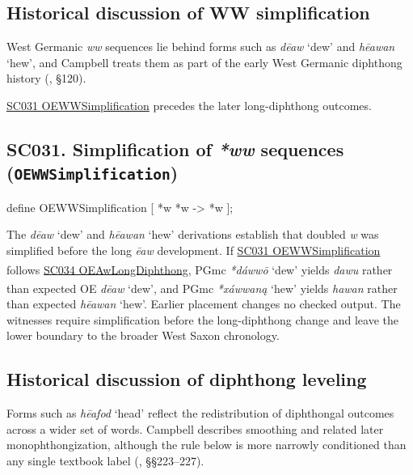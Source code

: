 \documentclass[
  british,
  a4paper,
  openany]{book}
\providecommand{\Pred}[1]{\textsuperscript{\dag}\emph{#1}}
\providecommand{\Recon}[1]{\emph{*#1}}
{\catcode`→=\active \global\def→{\ensuremath{\rightarrow}}}
\providecommand{\texorpdfstring}[2]{#1}
\providecommand{\Pred}[1]{\textsuperscript{\dag}\emph{#1}}
\providecommand{\Recon}[1]{\emph{*#1}}
{\catcode`→=\active \global\def→{\ensuremath{\rightarrow}}}
\begin{document}
\subsection{Historical discussion of WW
simplification}\label{historical-discussion-of-ww-simplification}

West Germanic \emph{ww} sequences lie behind forms such as \emph{dēaw}
`dew' and \emph{hēawan} `hew', and Campbell treats them as part of the
early West Germanic diphthong history
(, §120).

\hyperref[rule-OEWWSimplification]{SC031 OEWWSimplification} precedes
the later long-diphthong outcomes.

\subsection{\texorpdfstring{SC031. Simplification of \emph{*ww}
sequences
(\texttt{OEWWSimplification})}{SC031. Simplification of  sequences (OEWWSimplification)}}\label{rule-OEWWSimplification}

\begin{ReaderFacingFoma}
define OEWWSimplification [
    {*w} {*w} -> {*w}
];
\end{ReaderFacingFoma}

The \emph{dēaw} `dew' and \emph{hēawan} `hew' derivations establish that
doubled \emph{w} was simplified before the long \emph{ēaw} development.
If \hyperref[rule-OEWWSimplification]{SC031 OEWWSimplification} follows
\hyperref[rule-OEAwLongDiphthong]{SC034 OEAwLongDiphthong}, PGmc
\Recon{dáwwō} `dew' yields \Pred{dawu} rather than expected OE
\emph{dēaw} `dew', and PGmc \Recon{xáwwaną} `hew' yields \Pred{hawan}
rather than expected \emph{hēawan} `hew'. Earlier placement changes no
checked output. The witnesses require simplification before the
long-diphthong change and leave the lower boundary to the broader West
Saxon chronology.

\subsection{Historical discussion of diphthong
leveling}\label{historical-discussion-of-diphthong-leveling}

Forms such as \emph{hēafod} `head' reflect the redistribution of
diphthongal outcomes across a wider set of words. Campbell describes
smoothing and related later monophthongization, although the rule below
is more narrowly conditioned than any single textbook label
(, §§223--227).
\end{document}
